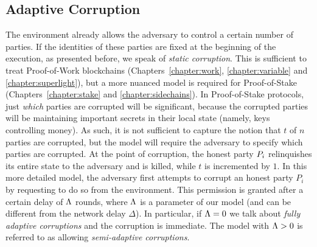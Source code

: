 \subsection{Adaptive Corruption}
\label{sec:prelim-corr}

The environment already allows the adversary to control a certain number
of parties. If the identities of these parties are fixed at the beginning of
the execution, as presented before, we speak of
\emph{static corruption}. This is sufficient to treat
Proof-of-Work blockchains (Chapters~\ref{chapter:work}, \ref{chapter:variable}
and \ref{chapter:superlight}), but a more nuanced model is required for
Proof-of-Stake (Chapters~\ref{chapter:stake} and \ref{chapter:sidechains}).
In Proof-of-Stake protocols, just \emph{which} parties are
corrupted will be significant, because the corrupted parties will be maintaining
important secrets in their local state (namely, keys controlling money). As
such, it is not sufficient to capture the notion that $t$ of $n$ parties are
corrupted, but the model will require the adversary to specify which parties are
corrupted. At the point of corruption, the honest party $P_i$ relinquishes
its entire state to the adversary and is killed, while $t$ is incremented by
$1$. In this more detailed model, the adversary first attempts to corrupt an
honest party $P_i$ by requesting to do so from the environment. This permission
is granted after a certain delay of $\Lambda$ rounds, where $\Lambda$ is a
parameter of our model (and can be different from the network delay $\Delta$).
In particular, if $\Lambda=0$ we talk about \emph{fully adaptive
corruptions} and the corruption is immediate.
The model with $\Lambda>0$ is referred to as allowing \emph{semi-adaptive
corruptions}.
